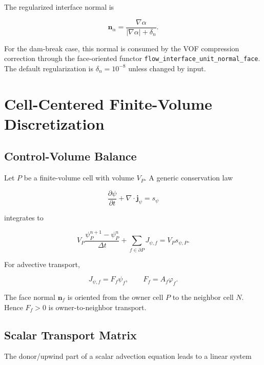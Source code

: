 \documentclass[11pt]{article}
\newcommand{\grad}{\nabla}
\newcommand{\divergence}{\nabla\!\cdot}
\begin{document}
The regularized interface normal is

\begin{equation}
  \mathbf{n}_{\alpha}
  =
  \frac{\grad\alpha}{|\grad\alpha|+\delta_n}.
  \label{eq:interface-normal}
\end{equation}

For the dam-break case, this normal is consumed by the VOF compression
correction through the face-oriented functor
\texttt{flow\_interface\_unit\_normal\_face}.  The default regularization is
\(\delta_n=10^{-8}\) unless changed by input.

\section{Cell-Centered Finite-Volume Discretization}

\subsection{Control-Volume Balance}

Let \(P\) be a finite-volume cell with volume \(V_P\).  A generic conservation
law

\begin{equation}
  \frac{\partial\psi}{\partial t}
  +
  \divergence\mathbf{j}_{\psi}
  =
  s_\psi
\end{equation}

integrates to

\begin{equation}
  V_P
  \frac{\psi_P^{n+1}-\psi_P^n}{\Delta t}
  +
  \sum_{f\in\partial P}
  J_{\psi,f}
  =
  V_P s_{\psi,P}.
  \label{eq:fv-balance}
\end{equation}

For advective transport,

\begin{equation}
  J_{\psi,f}=F_f\psi_f,
  \qquad
  F_f=A_f\varphi_f.
\end{equation}

The face normal \(\mathbf{n}_f\) is oriented from the owner cell \(P\) to the
neighbor cell \(N\).  Hence \(F_f>0\) is owner-to-neighbor transport.

\subsection{Scalar Transport Matrix}

The donor/upwind part of a scalar advection equation leads to a linear system
\end{document}
